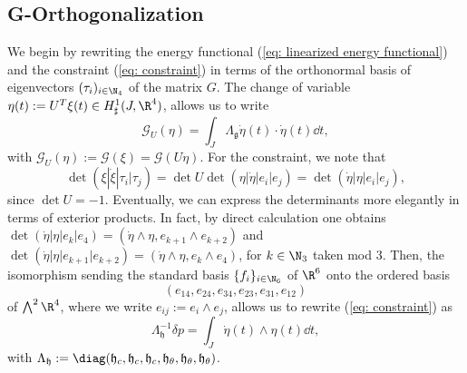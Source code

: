 \subsection{G-Orthogonalization}
We begin by rewriting the energy functional (\ref{eq: linearized energy functional}) and the constraint (\ref{eq: constraint}) in terms of the orthonormal basis of eigenvectors $(\tau_i)_{i \in \N_4}$ of the matrix $G$. The change of variable $\eta(t) := U^T \xi(t) \in H_{\sharp}^{1}(J, \R^4)$, allows us to write
\begin{equation}
\label{eq: G-orth energy functional}
\mathcal{G}_{U}(\eta) = \int_{J} \Lambda_{\mathfrak{g}} \dot{\eta}(t) \cdot \dot{\eta}(t) \dd t,
\end{equation}
with $\mathcal{G}_{U}(\eta) := \mathcal{G}(\xi) = \mathcal{G}(U \eta)$. For the constraint, we note that
\begin{equation}
\det(\xi |\dot{\xi} | \tau_i | \tau_j) =  \det U \det (\eta | \dot{\eta} | e_i | e_j) = \det(\dot{\eta} | \eta | e_i |e_j),
\end{equation}
since $\det U = -1$. Eventually, we can express the determinants more elegantly in terms of exterior products. In fact, by direct calculation one obtains $\det(\dot{\eta} | \eta | e_k |e_4) = (\dot{\eta} \wedge \eta, e_{k + 1} \wedge e_{k+2})$ and $\det(\dot{\eta} |\eta | e_{k + 1} |e_{k + 2}) = (\dot{\eta} \wedge \eta, e_k \wedge e_4)$, for $k \in \N_3$ taken mod 3. Then, the isomorphism sending the standard basis $\{f_i\}_{i \in \N_6}$ of $\R^6$ onto the ordered basis 
\begin{equation}
\label{eq: basis of bivectors}
(e_{14}, e_{24}, e_{34}, e_{23}, e_{31}, e_{12})
\end{equation}
of $\bigwedge^2 \R^4$, where we write $e_{ij} := e_i \wedge e_j$, allows us to rewrite (\ref{eq: constraint}) as
\begin{equation}
\label{eq: G-orth constraint}
\Lambda_{\mathfrak{h}}^{-1} \delta p = \int_{J} \dot{\eta}(t) \wedge\eta(t) \dd t,
\end{equation}
with $\Lambda_{\mathfrak{h}} := \diag(\mathfrak{h}_{c}, \mathfrak{h}_{c}, \mathfrak{h}_{c}, \mathfrak{h}_{\theta}, \mathfrak{h}_{\theta}, \mathfrak{h}_{\theta})$.

